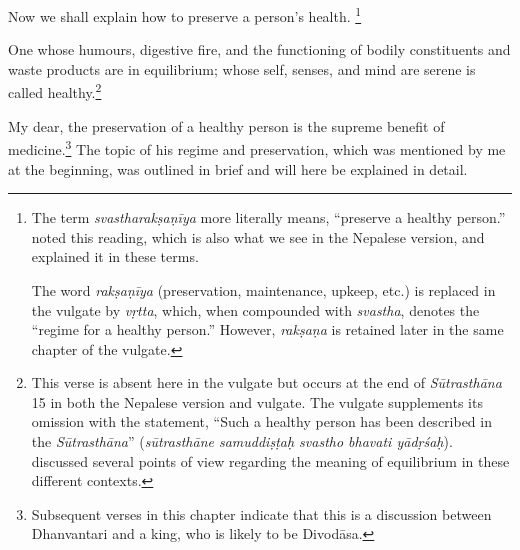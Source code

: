 \begin{translation}    
  
\item [1] 
Now we shall explain how to preserve a person's health.%
	\footnote{The term \emph{svastharakṣaṇīya} more literally means, ``preserve a healthy person.''  noted this reading, which is also what we see in the Nepalese version, and explained it in these terms.
    
    The word \emph{rakṣaṇīya} (preservation, maintenance, upkeep, etc.) is replaced in the vulgate \citep[808]{vulgate} by \emph{vṛtta}, which, when compounded with \emph{svastha}, denotes the “regime for a healthy person.” However, \emph{rakṣaṇa} is retained later in the same chapter of the vulgate.} 

\item [2] One whose humours, digestive fire, and the functioning of
bodily constituents and waste products are in equilibrium; whose self,
senses, and mind are serene is called healthy.\footnote{This verse is
    absent here in the vulgate but occurs at the end of \emph{Sūtrasthāna}
    15 in both the Nepalese version and vulgate. The vulgate
    \citep[808]{vulgate} supplements its omission with the statement,
    ``Such a healthy person has been described in the \emph{Sūtrasthāna}''
    (\emph{sūtrasthāne samuddiṣṭaḥ svastho bhavati yādṛśaḥ}).
     discussed several points of view regarding
    the meaning of equilibrium in these different contexts.}   

\item [3] My dear, the preservation of a healthy person is the supreme
benefit of medicine.\footnote{Subsequent verses in this chapter
    indicate that this is a discussion between Dhanvantari and a king, who
    is likely to be Divodāsa.} %
    The topic of his regime and preservation, which was mentioned by me at
    the beginning, was outlined in brief and will here be explained in
    detail. %


\end{translation}
